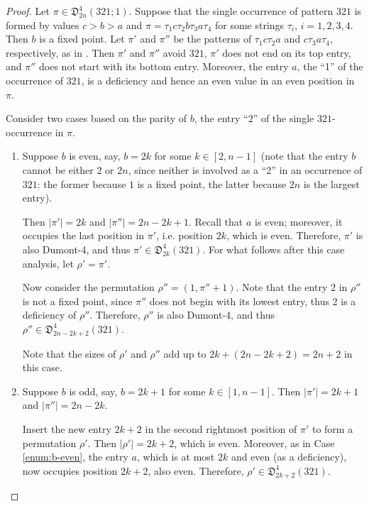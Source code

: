 \documentclass[
final
]{dmtcs-episciences}
\theoremstyle{definition}
\theoremstyle{remark}
\begin{document}
\begin{proof}
Let $\pi \in \mathfrak{D}^4_{2n}(321;1)$. Suppose that the single occurrence of pattern $321$ is formed by values $c>b>a$ and $\pi=\tau_1c\tau_2b\tau_3a\tau_4$ for some strings $\tau_i$, $i=1,2,3,4$. Then $b$ is a fixed point. Let $\pi'$ and $\pi''$ be the patterns of $\tau_1c\tau_2a$ and $c\tau_3a\tau_4$, respectively, as in \cite{Zeilberger_lovely}.  Then $\pi'$ and $\pi''$ avoid $321$, $\pi'$ does not end on its top entry, and $\pi''$ does not start with its bottom entry. Moreover, the entry $a$, the ``1'' of the occurrence of $321$, is a deficiency and hence an even value in an even position in $\pi$. 

Consider two cases based on the parity of $b$, the entry ``$2$'' of the single $321$-occurrence in $\pi$.

\begin{enumerate}

\item \label{enum:b-even} Suppose $b$ is even, say, $b=2k$ for some $k\in[2,n-1]$ (note that the entry $b$ cannot be either $2$ or $2n$, since neither is involved as a ``2'' in an occurrence of $321$: the former because $1$ is a fixed point, the latter because $2n$ is the largest entry).

Then $|\pi'|=2k$ and $|\pi''|=2n-2k+1$. Recall that $a$ is even; moreover, it occupies the last position in $\pi'$, i.e. position $2k$, which is even. Therefore, $\pi'$ is also Dumont-4, and thus $\pi'\in\mathfrak{D}^4_{2k}(321)$. For what follows after this case analysis, let $\rho'=\pi'$.

Now consider the permutation $\rho''=(1,\pi''+1)$.  Note that the entry 2 in $\rho''$ is not a fixed point, since $\pi''$ does not begin with its lowest entry, thus 2 is a deficiency of $\rho''$. Therefore, $\rho''$ is also Dumont-4, and thus $\rho''\in\mathfrak{D}^4_{2n-2k+2}(321)$.

Note that the sizes of $\rho'$ and $\rho''$ add up to $2k+(2n-2k+2)=2n+2$ in this case.

\item \label{enum:b-odd} Suppose $b$ is odd, say, $b=2k+1$ for some $k\in[1,n-1]$.  Then $|\pi'|=2k+1$ and $|\pi''|=2n-2k$.  

Insert the new entry $2k+2$ in the second rightmost position of $\pi'$ to form a permutation $\rho'$.  Then $|\rho'|=2k+2$, which is even. Moreover, as in Case \ref{enum:b-even}, the entry $a$, which is at most $2k$ and even (as a deficiency), now occupies position $2k+2$, also even. Therefore, $\rho'\in\mathfrak{D}^4_{2k+2}(321)$.


\end{enumerate}
\end{proof}
\end{document}
